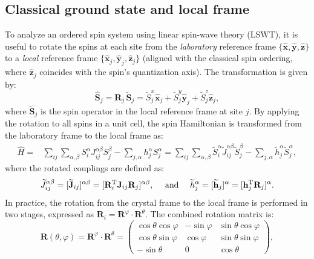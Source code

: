 \documentclass[aps, prx, nofootinbib, superscriptaddress]{revtex4-2}
\begin{document}
\subsection{Classical ground state and local frame}
To analyze an ordered spin system using linear spin-wave theory (LSWT), it is useful to rotate the spins at each site from the \emph{laboratory} reference frame $\{\hat{\mathbf{x}}, \hat{\mathbf{y}}, \hat{\mathbf{z}}\}$ to a \emph{local} reference frame $\{\hat{\mathbf{x}}_{j}, \hat{\mathbf{y}}_{j}, \hat{\mathbf{z}}_{j}\}$ (aligned with the classical spin ordering, where $\hat{\mathbf{z}}_{j}$ coincides with the spin's quantization axis). 
The transformation is given by:
\begin{equation}
    \label{eq: Spin rotation}
    \hat{\mathbf{S}}_j = \mathbf{R}_j \, \widetilde{\mathbf{S}}_j 
    = \widetilde{S}^{x}_{j} \hat{\mathbf{x}}_{j} + \widetilde{S}^{y}_{j} \hat{\mathbf{y}}_{j} + \widetilde{S}^{z}_{j} \hat{\mathbf{z}}_{j},
\end{equation}
where $\widetilde{\mathbf{S}}_j$ is the spin operator in the local reference frame at site $j$.
By applying the rotation to all spins in a unit cell, the spin Hamiltonian is transformed from the laboratory frame to the local frame as:
\begin{equation}\label{eq: Rotated Hamiltonian}
    \begin{split}
        \hat{H} = & \sum_{ij} \sum_{\alpha, \beta} S^{\alpha}_{i} J_{ij}^{\alpha\beta} S^{\beta}_{j} - \sum_{j, \alpha} h_{j}^{\alpha} S^{\alpha}_{j}
        = \sum_{ij} \sum_{\alpha, \beta} \widetilde{S}^{\alpha}_{i} \widetilde{J}_{ij}^{\alpha\beta} \widetilde{S}^{\beta}_{j} - \sum_{j, \alpha} \widetilde{h}_{j}^{\alpha} \widetilde{S}^{\alpha}_{j},
    \end{split}
\end{equation}
where the rotated couplings are defined as:
\begin{equation}
    \widetilde{J}_{ij}^{\alpha\beta}  = [\widetilde{\mathbf{J}}_{ij}]^{\alpha\beta} = [\mathbf{R}_i^{\rm T} \mathbf{J}_{ij} \mathbf{R}_j]^{\alpha\beta}, 
    \quad \text{ and } \quad
     \widetilde{h}_{j}^{\alpha} = [\widetilde{\mathbf{h}}_j]^{\alpha} = [\mathbf{h}_{j}^{\rm T} \mathbf{R}_{j}]^{\alpha}.
\end{equation}
In practice, the rotation from the crystal frame to the local frame is performed in two stages, expressed as $\mathbf{R}_i = \mathbf{R}^{\varphi} \cdot \mathbf{R}^{\theta}$. The combined rotation matrix is:
\begin{equation}
    \mathbf{R} (\theta, \varphi) = \mathbf{R}^{\varphi} \cdot \mathbf{R}^{\theta} = 
    \begin{pmatrix} 
        \cos \theta \cos \varphi & -\sin \varphi & \sin \theta \cos \varphi \\
        \cos \theta \sin \varphi & \cos \varphi & \sin \theta \sin \varphi \\
        -\sin \theta & 0 & \cos \theta
    \end{pmatrix},
    \label{eq_frametransform_gen}
\end{equation}
\end{document}
